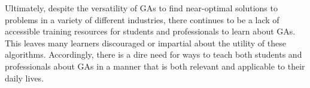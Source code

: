 \documentclass{article}
\begin{document}
Ultimately, despite the versatility of GAs to find near-optimal solutions to 
problems in a variety of different industries, there continues to be a lack of 
accessible training resources for students and professionals to learn about GAs. 
This leaves many learners discouraged or impartial about the utility of these 
algorithms. Accordingly, there is a dire need for ways to teach both students 
and professionals about GAs in a manner that is both relevant and applicable to 
their daily lives.
\end{document}
